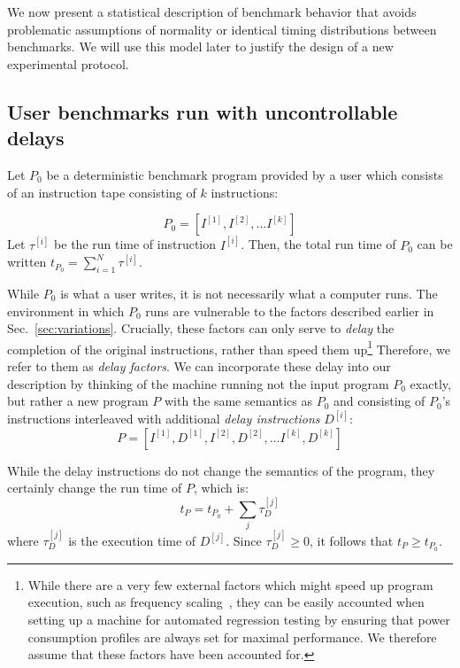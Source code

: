 \documentclass[conference]{IEEEtran}
\begin{document}
We now present a statistical description of benchmark behavior that avoids
problematic assumptions of normality or identical timing distributions between
benchmarks. We will use this model later to justify the design of a new
experimental protocol.

\subsection{User benchmarks run with uncontrollable delays}
\label{sec:programmodel}

Let $P_0$ be a deterministic benchmark program provided by a user which
consists of an instruction tape consisting of $k$ instructions:

\begin{equation}
    P_0 = \left[I^{[1]}, I^{[2]}, \dots I^{[k]}\right]
\end{equation}
%
Let $\tau^{[i]}$ be the run time of instruction $I^{[i]}$. Then, the total run
time of $P_0$ can be written $t_{P_0} = \sum_{i=1}^N \tau^{[i]}$.

While $P_0$ is what a user writes, it is not necessarily what a computer runs.
The environment in which $P_0$ runs are vulnerable to the factors described
earlier in Sec.~\ref{sec:variations}. Crucially, these factors can only serve
to \textit{delay} the completion of the original instructions, rather than
speed them up\footnote{While there are a very few external factors which might
speed up program execution, such as frequency scaling~\cite{RHEL6}, they can be
easily accounted when setting up a machine for automated regression testing by
ensuring that power consumption profiles are always set for maximal
performance. We therefore assume that these factors have been accounted for.}
Therefore, we refer to them as \textit{delay factors}.  We can incorporate
these delay into our description by thinking of the machine running not the
input program $P_0$ exactly, but rather a new program $P$ with the same
semantics as $P_0$ and consisting of $P_0$'s instructions interleaved with
additional \textit{delay instructions} $D^{[i]}$:
%
\begin{equation}
    P = \left[I^{[1]}, D^{[1]}, I^{[2]}, D^{[2]}, \dots I^{[k]}, D^{[k]}\right]
\end{equation}

While the delay instructions do not change the semantics of the program, they certainly change the run time of $P$, which is:
%
\begin{equation}
    t_P = t_{P_0} + \sum_{j} \tau^{[j]}_D
\end{equation}
%
where $\tau^{[j]}_D$ is the execution time of $D^{[j]}$.
Since $\tau^{[j]}_D \ge 0$, it follows that $t_P \ge t_{P_0}$.
\end{document}
